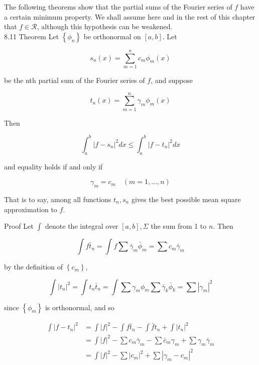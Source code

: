 \documentclass[10pt]{article}
\begin{document}
The following theorems show that the partial sums of the Fourier series of $f$ have a certain minimum property. We shall assume here and in the rest of this chapter that $f \in \mathscr{R}$, although this hypothesis can be weakened.\\
8.11 Theorem Let $\left\{\phi_{n}\right\}$ be orthonormal on $[a, b]$. Let


\begin{equation*}
s_{n}(x)=\sum_{m=1}^{n} c_{m} \phi_{m}(x) \tag{68}
\end{equation*}


be the nth partial sum of the Fourier series of $f$, and suppose


\begin{equation*}
t_{n}(x)=\sum_{m=1}^{n} \gamma_{m} \phi_{m}(x) \tag{69}
\end{equation*}


Then


\begin{equation*}
\int_{a}^{b}\left|f-s_{n}\right|^{2} d x \leq \int_{a}^{b}\left|f-t_{n}\right|^{2} d x \tag{70}
\end{equation*}


and equality holds if and only if


\begin{equation*}
\gamma_{m}=c_{m} \quad(m=1, \ldots, n) \tag{71}
\end{equation*}


That is to say, among all functions $t_{n}, s_{n}$ gives the best possible mean square approximation to $f$.

Proof Let $\int$ denote the integral over $[a, b], \Sigma$ the sum from 1 to $n$. Then

$$
\int f \bar{t}_{n}=\int f \sum \bar{\gamma}_{m} \bar{\phi}_{m}=\sum c_{m} \bar{\gamma}_{m}
$$

by the definition of $\left\{c_{m}\right\}$,

$$
\int\left|t_{n}\right|^{2}=\int t_{n} \bar{t}_{n}=\int \sum \gamma_{m} \phi_{m} \sum \bar{\gamma}_{k} \bar{\phi}_{k}=\sum\left|\gamma_{m}\right|^{2}
$$

since $\left\{\phi_{m}\right\}$ is orthonormal, and so

$$
\begin{aligned}
\int\left|f-t_{n}\right|^{2} & =\int|f|^{2}-\int f \bar{t}_{n}-\int \bar{f} t_{n}+\int\left|t_{n}\right|^{2} \\
& =\int|f|^{2}-\sum c_{m} \bar{\gamma}_{m}-\sum \bar{c}_{m} \gamma_{m}+\sum \gamma_{m} \bar{\gamma}_{m} \\
& =\int|f|^{2}-\sum\left|c_{m}\right|^{2}+\sum\left|\gamma_{m}-c_{m}\right|^{2}
\end{aligned}
$$
\end{document}
